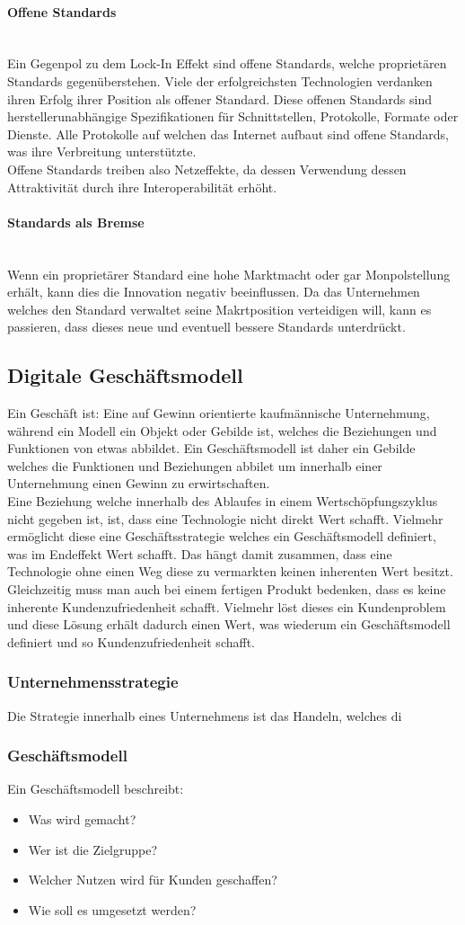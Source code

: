 \documentclass{article}
\newcommand{\paragraphlb}[1]{\paragraph{#1}\mbox{}\\}
\begin{document}
		\paragraphlb{Offene Standards}
		Ein Gegenpol zu dem Lock-In Effekt sind offene Standards, welche proprietären Standards gegenüberstehen. Viele der erfolgreichsten Technologien verdanken ihren Erfolg ihrer Position als offener Standard. Diese offenen Standards sind herstellerunabhängige Spezifikationen für Schnittstellen, Protokolle, Formate oder Dienste. Alle Protokolle auf welchen das Internet aufbaut sind offene Standards, was ihre Verbreitung unterstützte. \\
		Offene Standards treiben also Netzeffekte, da dessen Verwendung dessen Attraktivität durch ihre Interoperabilität erhöht.
		\paragraphlb{Standards als Bremse}
		Wenn ein proprietärer Standard eine hohe Marktmacht oder gar Monpolstellung erhält, kann dies die Innovation negativ beeinflussen. Da das Unternehmen welches den Standard verwaltet seine Makrtposition verteidigen will, kann es passieren, dass dieses neue und eventuell bessere Standards unterdrückt. \\
		\subsection{Digitale Geschäftsmodell}
		Ein Geschäft ist: Eine auf Gewinn orientierte kaufmännische Unternehmung, während ein Modell ein Objekt oder Gebilde ist, welches die Beziehungen und Funktionen von etwas abbildet. Ein Geschäftsmodell ist daher ein Gebilde welches die Funktionen und Beziehungen abbilet um innerhalb einer Unternehmung einen Gewinn zu erwirtschaften. \\
		Eine Beziehung welche innerhalb des Ablaufes in einem Wertschöpfungszyklus nicht gegeben ist, ist, dass eine Technologie nicht direkt Wert schafft. Vielmehr ermöglicht diese eine Geschäftsstrategie welches ein Geschäftsmodell definiert, was im Endeffekt Wert schafft. Das hängt damit zusammen, dass eine Technologie ohne einen Weg diese zu vermarkten keinen inherenten Wert besitzt. Gleichzeitig muss man auch bei einem fertigen Produkt bedenken, dass es keine inherente Kundenzufriedenheit schafft. Vielmehr löst dieses ein Kundenproblem und diese Lösung erhält dadurch einen Wert, was wiederum ein Geschäftsmodell definiert und so Kundenzufriedenheit schafft.
		\subsubsection{Unternehmensstrategie}
		Die Strategie innerhalb eines Unternehmens ist das Handeln, welches di
		\subsubsection{Geschäftsmodell}
		Ein Geschäftsmodell beschreibt:
		\begin{itemize}
			\item{Was wird gemacht?}
			\item{Wer ist die Zielgruppe?}
			\item{Welcher Nutzen wird für Kunden geschaffen?}
			\item{Wie soll es umgesetzt werden?}
		\end{itemize}
\end{document}
